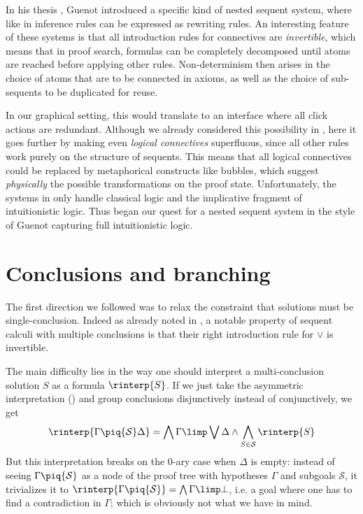 In his thesis \cite{guenot_nested_2013}, Guenot introduced a specific kind of
nested sequent system, where like in  inference rules can be expressed
as rewriting rules. An interesting feature of these systems is that all
introduction rules for connectives are \emph{invertible}, which means that in
proof search, formulas can be completely decomposed until atoms are reached
before applying other rules. Non-determinism then arises in the choice of atoms
that are to be connected in axioms, as well as the choice of sub-sequents to be
duplicated for reuse.

In our graphical setting, this would translate to an interface where all click
actions are redundant. Although we already considered this possibility in
, here it goes further by making even \emph{logical
connectives} superfluous, since all other rules work purely on the structure of
sequents. This means that all logical connectives could be replaced by
metaphorical constructs like bubbles, which suggest \emph{physically} the
possible transformations on the proof state. Unfortunately, the systems in
\cite{guenot_nested_2013} only handle classical logic and the implicative
fragment of intuitionistic logic. Thus began our quest for a nested sequent
system in the style of Guenot capturing full intuitionistic logic.


\section{Conclusions and branching}

The first direction we followed was to relax the constraint that solutions must
be single-conclusion. Indeed as already noted in , a
notable property of sequent calculi with multiple conclusions is that their
right introduction rule for $\lor$ is invertible.

The main difficulty lies in the way one should interpret a multi-conclusion
solution $S$ as a formula $\rinterp{S}$. If we just take the asymmetric
interpretation () and group conclusions disjunctively instead of
conjunctively, we get
$$
\rinterp{\Gamma \piq{\mathcal{S}} \Delta} =
\bigwedge \Gamma \limp \bigvee \Delta \land \bigwedge_{S \in \mathcal{S}}{\rinterp{S}}
$$
But this interpretation breaks on the 0-ary case when $\Delta$ is empty: instead
of seeing $\Gamma \piq{\mathcal{S}}$ as a node of the proof tree with hypotheses
$\Gamma$ and subgoals $\mathcal{S}$, it trivializes it to $\rinterp{\Gamma
\piq{\mathcal{S}}} = \bigwedge \Gamma \limp \bot$, i.e. a goal where one has to
find a contradiction in $\Gamma$; which is obviously not what we have in mind.

